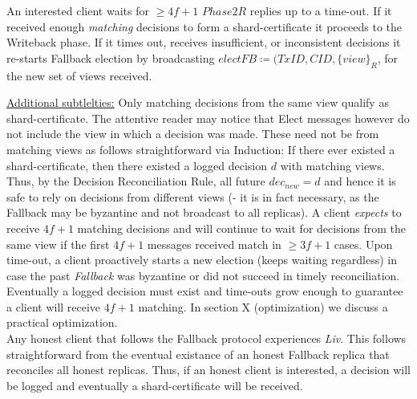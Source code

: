 An interested client waits for $\geq 4f+1$ $Phase2R$ replies up to a time-out. If it received enough \textit{matching} decisions to form a shard-certificate it proceeds to the Writeback phase. If it times out, receives insufficient, or inconsistent decisions it re-starts Fallback election by broadcasting $electFB \coloneqq (TxID, CID, \{view\}_R$, for the new set of views received.

\underline{Additional subtlelties:} Only matching decisions from the same view qualify as shard-certificate. The attentive reader may notice that Elect messages however do not include the view in which a decision was made. These need not be from matching views as follows straightforward via Induction: If there ever existed a shard-certificate, then there existed a logged decision $d$ with matching views. Thus, by the Decision Reconciliation Rule, all future $dec_{new} = d$ and hence it is safe to rely on decisions from different views (- it is in fact necessary, as the Fallback may be byzantine and not broadcast to all replicas).
A client \textit{expects} to receive $4f+1$ matching decisions and will continue to wait for decisions from the same view if the first $4f+1$ messages received match in $\geq 3f+1$ cases. Upon time-out, a client proactively starts a new election (keeps waiting regardless) in case the past \textit{Fallback} was byzantine or did not succeed in timely reconciliation. Eventually a logged decision must exist and time-outs grow enough to guarantee a client will receive $4f+1$ matching. In section X (optimization) we discuss a practical optimization.
 \\


Any honest client that follows the Fallback protocol experiences \textit{Liv}. This follows straightforward from the eventual existance of an honest Fallback replica that reconciles all honest replicas. Thus, if an honest client is interested, a decision will be logged and eventually a shard-certificate will be received.

